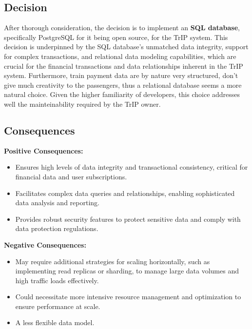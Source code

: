\subsection*{Decision}
After thorough consideration, the decision is to implement an \textbf{SQL database}, specifically PostgreSQL for it being open source, for the TrIP system. This decision is underpinned by the SQL database's unmatched data integrity, support for complex transactions, and relational data modeling capabilities, which are crucial for the financial transactions and data relationships inherent in the TrIP system. Furthermore, train payment data are by nature very structured, don't give much creativity to the passengers, thus a relational database seems a more natural choice. Given the higher familiarity of developers, this choice addresses well the mainteinability required by the TrIP owner.

\subsection*{Consequences}
\textbf{Positive Consequences:}
\begin{itemize}
    \item Ensures high levels of data integrity and transactional consistency, critical for financial data and user subscriptions.
    \item Facilitates complex data queries and relationships, enabling sophisticated data analysis and reporting.
    \item Provides robust security features to protect sensitive data and comply with data protection regulations.
\end{itemize}
\textbf{Negative Consequences:}
\begin{itemize}
    \item May require additional strategies for scaling horizontally, such as implementing read replicas or sharding, to manage large data volumes and high traffic loads effectively.
    \item Could necessitate more intensive resource management and optimization to ensure performance at scale.
    \item A less flexible data model.
\end{itemize}